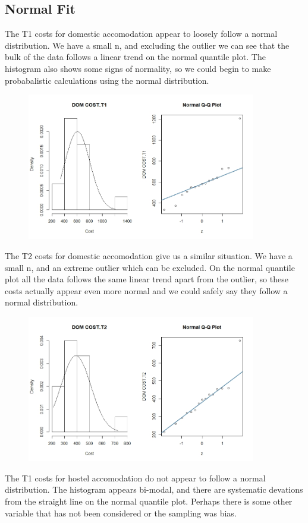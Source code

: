 \documentclass[]{article}
\begin{document}


\subsection{Normal Fit}
The T1 costs for domestic accomodation appear to loosely follow a normal distribution. We have a small n, and excluding the outlier we can see that the bulk of the data follows a linear trend on the normal quantile plot. The histogram also shows some signs of normality, so we could begin to make probabalistic calculations using the normal distribution.
\begin{figure}[H]
\centering
\includegraphics[width=10cm]{RStudio/jpeg/Norm_DOM_T1.jpeg}
\end{figure}
The T2 costs for domestic accomodation give us a similar situation. We have a small n, and an extreme outlier which can be excluded. On the normal quantile plot all the data follows the same linear trend apart from the outlier, so these costs actually appear even more normal and we could safely say they follow a normal distribution.
\begin{figure}[H]
\centering
\includegraphics[width=10cm]{RStudio/jpeg/Norm_DOM_T2.jpeg}
\end{figure}
The T1 costs for hostel accomodation do not appear to follow a normal distribution. The histogram appears bi-modal, and there are systematic devations from the straight line on the normal quantile plot. Perhaps there is some other variable that has not been considered or the sampling was bias.
\end{document}
